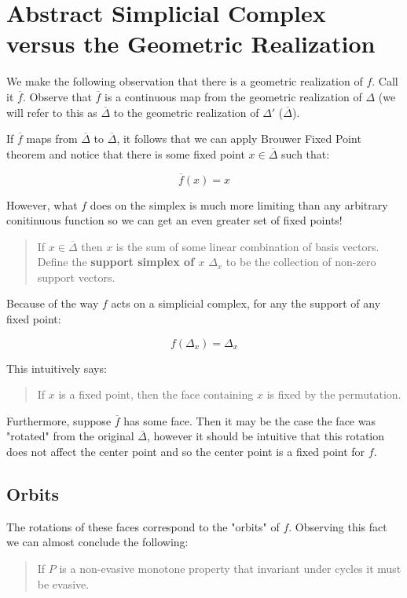 \documentclass[letterpaper,12pt]{article}
\newcommand{\ol}{\overline}
\begin{document}
\section{Abstract Simplicial Complex versus the Geometric Realization}

We make the following observation that there is a geometric realization of $f$. Call it $\ol{f}$. Observe that $\ol{f}$ is a continuous map from the geometric realization of $\Delta$ (we will refer to this as $\ol{\Delta}$ to the geometric realization of $\Delta'$ ($\ol{\Delta}$).

If $\ol{f}$ maps from $\ol{\Delta}$ to $\ol{\Delta}$, it follows that we can apply Brouwer Fixed Point theorem and notice that there is some fixed point $x \in \ol{\Delta}$ such that:

$$\ol{f}(x) = x$$

However, what $f$ does on the simplex is much more limiting than any arbitrary conitinuous function so we can get an even greater set of fixed points!

\begin{quote}
    If $x \in \ol{\Delta}$ then $x$ is the sum of some linear combination of basis vectors. Define the \textbf{support simplex of $x$} $\Delta_x$ to be the collection of non-zero support vectors.
\end{quote}

Because of the way $f$ acts on a simplicial complex, for any the support of any fixed point:

$$f(\Delta_{x}) = \Delta_x$$

This intuitively says:

\begin{quote}
    If $x$ is a fixed point, then the face containing $x$ is fixed by the permutation.
\end{quote}

Furthermore, suppose $\ol{f}$ has some face. Then it may be the case the face was "rotated" from the original $\ol{\Delta}$, however it should be intuitive that this rotation does not affect the center point and so the center point is a fixed point for $f$.

\subsection{Orbits}

The rotations of these faces correspond to the "orbits" of $f$. Observing this fact we can almost conclude the following:

\begin{quote}
    If $P$ is a non-evasive monotone property that invariant under cycles it must be evasive.
\end{quote}
\end{document}
